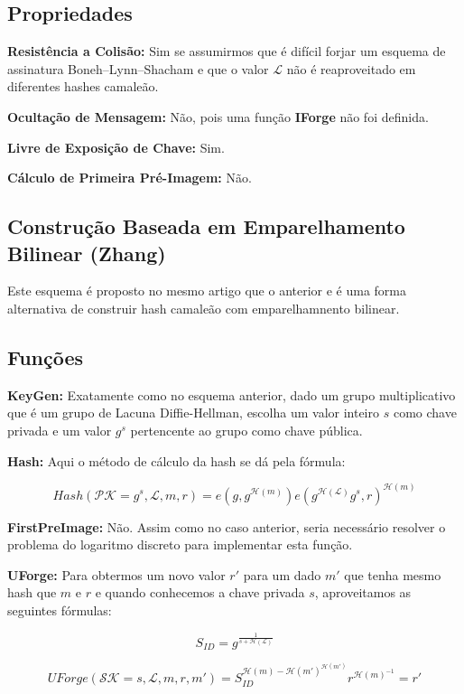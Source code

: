 \documentclass[a4paper]{article}
\begin{document}
\subsection{Propriedades}

\textbf{Resistência a Colisão: }Sim se assumirmos que é difícil forjar
um esquema de assinatura Boneh–Lynn–Shacham e que o valor
$\mathcal{L}$ não é reaproveitado em diferentes hashes camaleão.

\textbf{Ocultação de Mensagem: }Não, pois uma função \textbf{IForge}
não foi definida.

\textbf{Livre de Exposição de Chave: } Sim.

\textbf{Cálculo de Primeira Pré-Imagem: }Não.

\subsection{Construção Baseada em Emparelhamento Bilinear (Zhang) \cite{zhang}}

Este esquema é proposto no mesmo artigo que o anterior e é uma forma
alternativa de construir hash camaleão com emparelhamnento bilinear.

\subsection{Funções}

\textbf{KeyGen: }Exatamente como no esquema anterior, dado um grupo
multiplicativo que é um grupo de Lacuna Diffie-Hellman, escolha um
valor inteiro $s$ como chave privada e um valor $g^s$ pertencente ao
grupo como chave pública.

\textbf{Hash: } Aqui o método de cálculo da hash se dá pela fórmula:

$$
Hash(\mathcal{PK}=g^s, \mathcal{L}, m, r) = e(g, g^{\mathcal{H}(m)})e(g^{\mathcal{H}(\mathcal{L})}g^s, r)^{\mathcal{H}(m)}
$$

\textbf{FirstPreImage:} Não. Assim como no caso anterior, seria
necessário resolver o problema do logaritmo discreto para implementar
esta função.

\textbf{UForge:} Para obtermos um novo valor $r'$ para um dado $m'$
que tenha mesmo hash que $m$ e $r$ e quando conhecemos a chave privada
$s$, aproveitamos as seguintes fórmulas:

$$
S_{ID} = g^{\frac{1}{s+\mathcal{H}(\mathcal{L})}}
$$

$$
UForge(\mathcal{SK}=s, \mathcal{L}, m, r, m') = S_{ID}^{\mathcal{H}(m)-\mathcal{H}(m')^{\mathcal{H}(m')}}r^{\mathcal{H}(m)^{-1}} = r'
$$
\end{document}
